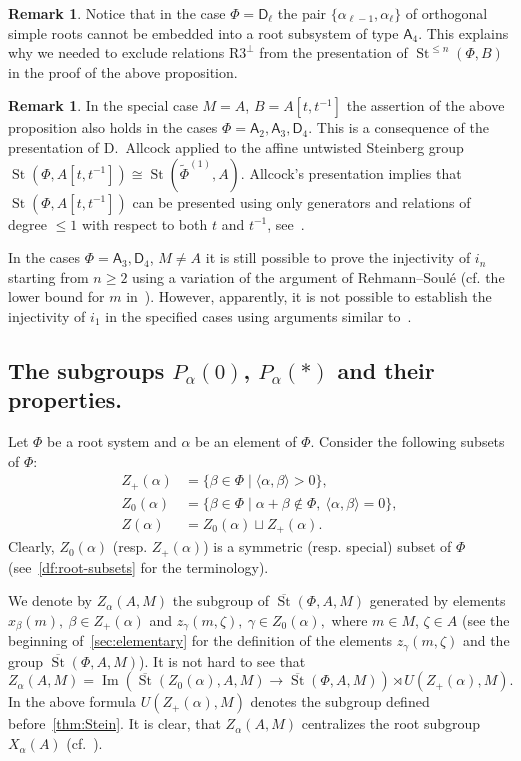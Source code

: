 \documentclass[oneside, 8pt]{amsart}
\theoremstyle{remark}
\theoremstyle{definition}
\numberwithin{lemma}{section}
\numberwithin{prop}{section}
\numberwithin{corollary}{section}
\numberwithin{externaltheorem}{section}
\newtheorem{rem}[lemma]{Remark}
\DeclareMathOperator{\Img}{Im}
\DeclareMathOperator{\St}{St}
\newcommand{\inv}{^{-1}}
\newcommand{\rA}{\mathsf{A}}
\newcommand{\rD}{\mathsf{D}}
\numberwithin{equation}{section}
\begin{document}
\begin{rem}
 Notice that in the case $\Phi=\rD_\ell$ the pair $\{\alpha_{\ell-1}, \alpha_{\ell}\}$ of orthogonal simple roots cannot be embedded into a root subsystem of type $\rA_4$. This explains why we needed to exclude relations $\text{R3}^\bot$ from the presentation of $\St^{\leq n}(\Phi, B)$ in the proof of the above proposition.
\end{rem}
\begin{rem}
 In the special case $M=A$, $B = A[t, t\inv]$ the assertion of the above proposition also holds in the cases $\Phi=\rA_2, \rA_3, \rD_4$. This is a consequence of the presentation of D.~Allcock applied to the affine untwisted Steinberg group $\St(\Phi, A[t, t\inv]) \cong \St(\widetilde{\Phi}^{(1)}, A)$. Allcock's presentation implies that $\St(\Phi, A[t, t\inv])$ can be presented using only generators and relations of degree $\leq 1$ with respect to both $t$ and $t^{-1}$, see~\cite[Corollary~1.3]{A13}.
 
 In the cases $\Phi = \rA_3, \rD_4$, $M \neq A$ it is still possible to prove the injectivity of $i_n$ starting from $n\geq 2$ using a variation of the argument of Rehmann--Soul{\'e} (cf. the lower bound for $m$ in~\cite[3.2.1]{RS76}). However, apparently, it is not possible to establish the injectivity of $i_1$ in the specified cases using arguments similar to~\cite{RS76}.
\end{rem}

\subsection{The subgroups \texorpdfstring{$P_\alpha(0)$}{Pa(0)}, \texorpdfstring{$P_\alpha(*)$}{Pa(*)} and their properties.} \label{sec:Pa0-basic}
Let $\Phi$ be a root system and $\alpha$ be an element of $\Phi$.
Consider the following subsets of $\Phi$:
\begin{align} Z_+(\alpha) & = \{ \beta \in \Phi \mid \langle \alpha, \beta \rangle > 0 \}, \\
   Z_0(\alpha) & = \{ \beta \in \Phi \mid \alpha + \beta \not\in \Phi,\ \langle \alpha, \beta \rangle = 0 \}, \\
   Z(\alpha)   & = Z_0(\alpha) \sqcup Z_+(\alpha). \end{align}
Clearly, $Z_0(\alpha)$ (resp. $Z_+(\alpha)$) is a symmetric (resp. special) subset of $\Phi$ (see~\cref{df:root-subsets} for the terminology).
   
We denote by $Z_\alpha(A, M)$ the subgroup of $\overline{\St}(\Phi, A, M)$ generated by elements
 $x_{\beta}(m),\ \beta \in Z_+(\alpha)$ and $z_{\gamma}(m, \zeta),\ \gamma \in Z_0(\alpha),$ where $m \in M$, $\zeta \in A$ (see the beginning of~\cref{sec:elementary} for the definition of the elements $z_\gamma(m, \zeta)$ and the group $\overline{\St}(\Phi, A, M)$).
It is not hard to see that \[Z_\alpha(A, M) = \Img\left(\overline{\St}(Z_0(\alpha), A, M) \to \overline{\St}(\Phi, A, M)\right) \rtimes U(Z_+(\alpha), M). \]
In the above formula $U(Z_+(\alpha), M)$ denotes the subgroup defined before~\cref{thm:Stein}.
It is clear, that $Z_\alpha(A, M)$ centralizes the root subgroup $X_\alpha(A)$ (cf.~\cite[984]{St71}).
\end{document}
